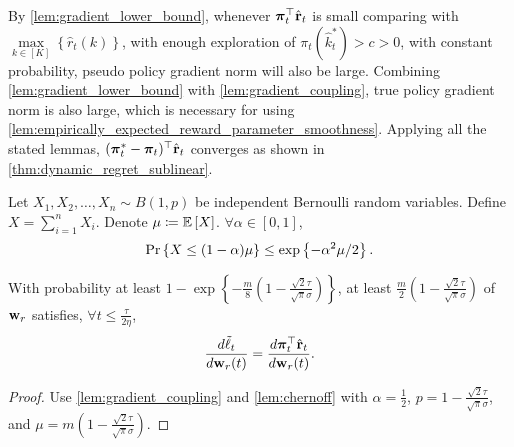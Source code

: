 By \cref{lem:gradient_lower_bound}, whenever ${\boldsymbol{\pi}}_t^\top \hat{{\mathbf{r}}}_t$ is small comparing with $\max\limits_{k \in \left[K\right]}\left\{ \hat{r}_{t}(k) \right\}$, with enough exploration of $\pi_{t}(\hat{k}_t^*) > c > 0$, with constant probability, pseudo policy gradient norm will also be large. Combining \cref{lem:gradient_lower_bound} with \cref{lem:gradient_coupling}, true policy gradient norm is also large, which is necessary for using \cref{lem:empirically_expected_reward_parameter_smoothness}. Applying all the stated lemmas, $( {\boldsymbol{\pi}}_t^* - {\boldsymbol{\pi}}_t)^\top \hat{{\mathbf{r}}}_t$ converges as shown in \cref{thm:dynamic_regret_sublinear}.

\begin{lem}[Chernoff]
\label{lem:chernoff}
    Let $X_1, X_2, \dots, X_n \sim B(1, p)$ be independent Bernoulli random variables. Define $X = \sum\limits_{i=1}^{n}{ X_i  }$. Denote $\mu \coloneqq {\mathbb{E}}\left[ X \right]$. $\forall \alpha \in [0,1]$,
\begin{equation*}
    \operatorname*{Pr}\left\{ X \le (1 - \alpha) \mu \right\} \le \exp\left\{ - \alpha^2 \mu / 2 \right\}.
\end{equation*}
\end{lem}

\begin{lem}
\label{lem:gradient_coupling_in_total}
With probability at least $1 - \exp\left\{ - \frac{m}{8} \left( 1 - \frac{\sqrt{2}\tau}{\sqrt{\pi}\sigma} \right) \right\}$, at least $\frac{m}{2}\left( 1 - \frac{\sqrt{2}\tau}{\sqrt{\pi}\sigma} \right) $ of ${\mathbf{w}}_r$ satisfies, $\forall t \le \frac{\tau}{ 2 \eta }$,
\begin{equation*}
	\frac{d\tilde{\ell}_t}{d {\mathbf{w}}_r(t)} = \frac{d {\boldsymbol{\pi}}_t^\top \hat{{\mathbf{r}}}_t}{d {\mathbf{w}}_r(t)}.
\end{equation*}
\end{lem}
\begin{proof}
Use \cref{lem:gradient_coupling} and \cref{lem:chernoff} with $\alpha = \frac{1}{2}$, $p = 1 - \frac{\sqrt{2}\tau}{\sqrt{\pi}\sigma}$, and $\mu = m \left( 1 - \frac{\sqrt{2}\tau}{\sqrt{\pi}\sigma} \right)$.
\end{proof}